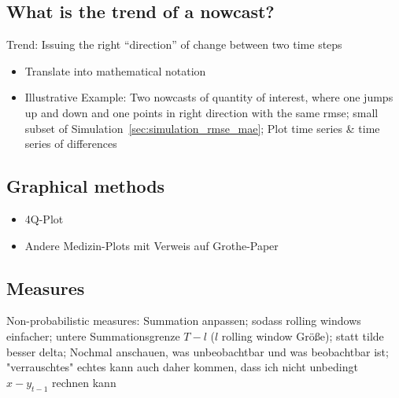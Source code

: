 \documentclass[oneside]{article}
\theoremstyle{plain}%
\theoremstyle{definition}
\newcommand{\ydiff}{\overset{\triangle}{y}}
\newcommand{\xdiff}{\overset{\triangle}{x}}
\begin{document}
\subsection{What is the trend of a nowcast?}

Trend: Issuing the right \enquote{direction} of change between two time steps

\begin{itemize}
  \item Translate into mathematical notation
  \item Illustrative Example: Two nowcasts of quantity of interest, where one jumps up and down and one points in right direction with the same rmse; small subset of Simulation~\ref{sec:simulation_rmse_mae}; Plot time series \& time series of differences
\end{itemize}

\subsection{Graphical methods}

\begin{itemize}
  \item 4Q-Plot
  \item Andere Medizin-Plots mit Verweis auf Grothe-Paper
\end{itemize}


\subsection{Measures}


Non-probabilistic measures: Summation anpassen; sodass rolling windows einfacher; untere Summationsgrenze $T - l$ ($l$ rolling window Größe); statt tilde besser delta; Nochmal anschauen, was unbeobachtbar und was beobachtbar ist; "verrauschtes" echtes kann auch daher kommen, dass ich nicht unbedingt $x - y_{t-1}$ rechnen kann
\end{document}
